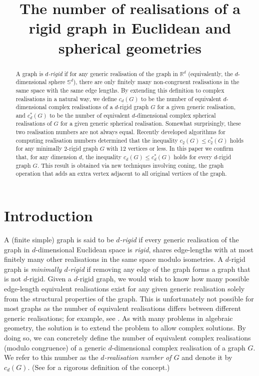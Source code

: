 \documentclass[ALCO]{cedram}
\title[The number of realisations of a rigid graph]{The number of realisations of a rigid graph in Euclidean and spherical geometries}
\author[\initial{S.} Dewar]{\firstname{Sean} \lastname{Dewar}}
\author[\initial{G.} Grasegger]{\firstname{Georg} \lastname{Grasegger}}
\begin{document}
\begin{abstract}
	A graph is \emph{$d$-rigid} if for any generic realisation of the graph in $\mathbb{R}^d$ (equivalently, the $d$-dimensional sphere $\mathbb{S}^d$), there are only finitely many non-congruent realisations in the same space with the same edge lengths.
	By extending this definition to complex realisations in a natural way,
	we define $c_d(G)$ to be the number of equivalent $d$-dimensional complex realisations of a $d$-rigid graph $G$ for a given generic realisation,
	and $c^*_d(G)$  to be the number of equivalent $d$-dimensional complex spherical realisations of $G$ for a given generic spherical realisation.
	Somewhat surprisingly, these two realisation numbers are not always equal.
	Recently developed algorithms for computing realisation numbers determined that the inequality $c_2(G) \leq c_2^*(G)$ holds for any minimally 2-rigid graph $G$ with 12 vertices or less.
	In this paper we confirm that, for any dimension $d$, the inequality $c_d(G) \leq c_d^*(G)$ holds for every $d$-rigid graph $G$.
	This result is obtained via new techniques involving coning,
	the graph operation that adds an extra vertex adjacent to all original vertices of the graph.
\end{abstract}

\maketitle


\section{Introduction}\label{sec:intro}

A (finite simple) graph is said to be \emph{$d$-rigid} if every generic realisation of the graph in $d$-dimensional Euclidean space is \emph{rigid},
\ie shares edge-lengths with at most finitely many other realisations in the same space modulo isometries.
A $d$-rigid graph is \emph{minimally $d$-rigid} if removing any edge of the graph forms a graph that is not $d$-rigid.
Given a $d$-rigid graph, we would wish to know how many possible edge-length equivalent realisations exist for any given generic realisation solely from the structural properties of the graph.
This is unfortunately not possible for most graphs as the number of equivalent realisations differs between different generic realisations;
for example, see .
As with many problems in algebraic geometry, the solution is to extend the problem to allow complex solutions.
By doing so,
we can concretely define the number of equivalent complex realisations (modulo congruence) of a generic $d$-dimensional complex realisation of a graph $G$.
We refer to this number as the \emph{$d$-realisation number of $G$} and denote it by $c_d(G)$.
(See  for a rigorous definition of the concept.)
\end{document}
